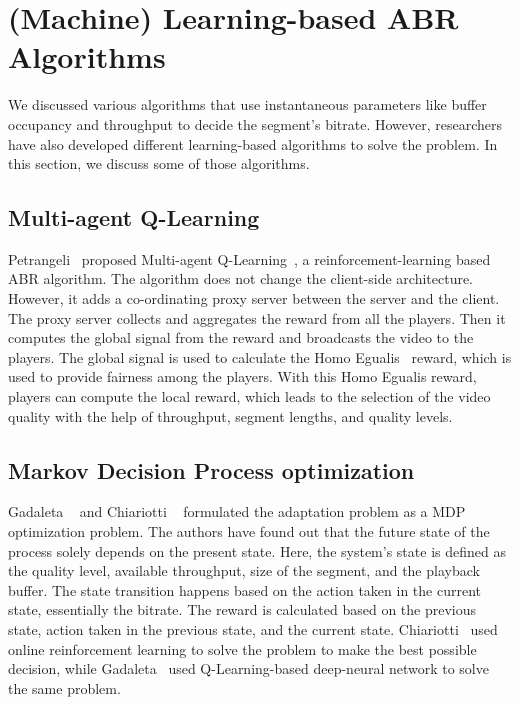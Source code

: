 \section{(Machine) Learning-based ABR Algorithms}
We discussed various algorithms that use instantaneous parameters like buffer occupancy and throughput to decide the segment's bitrate. However, researchers have also developed different learning-based algorithms to solve the problem. In this section, we discuss some of those algorithms.

\subsection{Multi-agent Q-Learning}
Petrangeli \etal\ proposed Multi-agent Q-Learning~\cite{6838245}, a reinforcement-learning based \ac{ABR} algorithm. The algorithm does not change the client-side architecture. However, it adds a co-ordinating proxy server between the server and the client. The proxy server collects and aggregates the reward from all the players. Then it computes the global signal from the reward and broadcasts the video to the players. The global signal is used to calculate the Homo Egualis~\cite{10.5555/1402298.1402344} reward, which is used to provide fairness among the players. With this Homo Egualis reward, players can compute the local reward, which leads to the selection of the video quality with the help of throughput, segment lengths, and quality levels.

\subsection{Markov Decision Process optimization}
Gadaleta \etal~\cite{8048013} and Chiariotti \etal~\cite{10.1145/2910017.2910603} formulated the adaptation problem as a \ac{MDP}~\cite{P-1066} optimization problem. The authors have found out that the future state of the process solely depends on the present state. Here, the system's state is defined as the quality level, available throughput, size of the segment, and the playback buffer. The state transition happens based on the action taken in the current state, essentially the bitrate. The reward is calculated based on the previous state, action taken in the previous state, and the current state. Chiariotti \etal\ used online reinforcement learning to solve the problem to make the best possible decision, while Gadaleta \etal\ used Q-Learning-based deep-neural network to solve the same problem.

